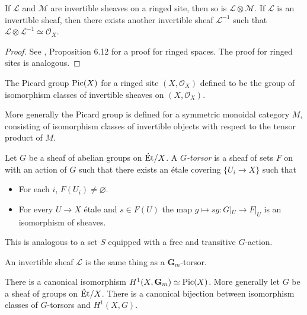 \begin{proposition}
	If $\mathcal{L}$ and $\mathcal{M}$ are invertible sheaves on a ringed site, then so is $\mathcal{L} \otimes \mathcal{M}$. If $\mathcal{L}$ is an invertible sheaf, then there exists another invertible sheaf $\mathcal{L}^{-1}$ such that $\mathcal{L} \otimes \mathcal{L}^{-1} \simeq \mathcal{O}_X$.
\end{proposition}

\begin{proof}
	See \cite{Hartshorne}, Proposition 6.12 for a proof for ringed spaces. The proof for ringed sites is analogous.
\end{proof}

\begin{proposition}
	The Picard group $\text{Pic}(X)$ for a ringed site $(X, \mathcal{O}_X)$ defined to be the group of isomorphism classes of invertible sheaves on $(X, \mathcal{O}_X)$.
\end{proposition}

\begin{remark}
	More generally the Picard group is defined for a symmetric monoidal category $M$, consisting of isomorphism classes of invertible objects with respect to the tensor product of $M$.
\end{remark}

\begin{definition}
	Let $G$ be a sheaf of abelian groups on $\text{\'Et}/X$. A \textit{$G$-torsor} is a sheaf of sets $F$ on with an action of $G$ such that there exists an \'etale covering $\{U_i \to X\}$ such that
	\begin{itemize}
		\item For each $i$, $F(U_i) \neq \varnothing$.
		\item For every $U \to X$ \'etale and $s \in F(U)$ the map $g \mapsto sg \colon G|_U \to F|_U$ is an isomorphism of sheaves.
	\end{itemize}
	This is analogous to a set $S$ equipped with a free and transitive $G$-action.
\end{definition}

\begin{remark}
	An invertible sheaf $\mathcal{L}$ is the same thing as a $\mathbf{G}_m$-torsor.
\end{remark}

\begin{theorem}
	There is a canonical isomorphism $H^1(X, \mathbf{G}_m) \simeq \text{Pic}(X)$. More generally let $G$ be a sheaf of groups on $\text{\'Et}/X$. There is a canonical bijection between isomorphism classes of $G$-torsors and $H^1(X,G)$.
\end{theorem}


